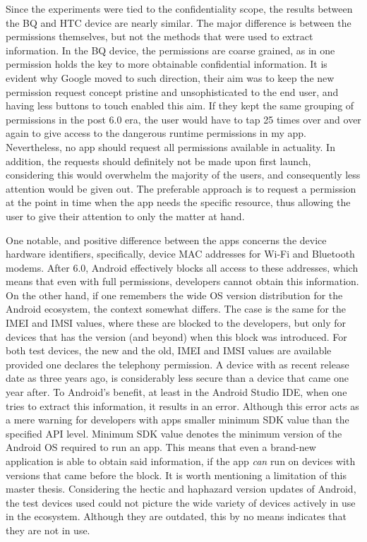 \documentclass[
  a4paper,  %
  twoside,  %
  bibliography=totoc,
  headsepline,
  cleardoublepage=empty,
  parskip=half,
  draft=false,
  open=any
]{scrbook}
\begin{document}
Since the experiments were tied to the confidentiality scope, the results between the BQ and HTC device are nearly similar. The major difference is between the permissions themselves, but not the methods that were used to extract information. In the BQ device, the permissions are coarse grained, as in one permission holds the key to more obtainable confidential information. It is evident why Google moved to such direction, their aim was to keep the new permission request concept pristine and unsophisticated to the end user, and having less buttons to touch enabled this aim. If they kept the same grouping of permissions in the post 6.0 era, the user would have to tap 25 times over and over again to give access to the dangerous runtime permissions in my app. Nevertheless, no app should request all permissions available in actuality. In addition, the requests should definitely not be made upon first launch, considering this would overwhelm the majority of the users, and consequently less attention would be given out. The preferable approach is to request a permission at the point in time when the app needs the specific resource, thus allowing the user to give their attention to only the matter at hand.

One notable, and positive difference between the apps concerns the device hardware identifiers, specifically, device MAC addresses for Wi-Fi and Bluetooth modems. After 6.0, Android effectively blocks all access to these addresses, which means that even with full permissions, developers cannot obtain this information. On the other hand, if one remembers the wide OS version distribution for the Android ecosystem, the context somewhat differs. The case is the same for the IMEI and IMSI values, where these are blocked to the developers, but only for devices that has the version (and beyond) when this block was introduced. For both test devices, the new and the old, IMEI and IMSI values are available provided one declares the telephony permission. A device with as recent release date as three years ago, is considerably less secure than a device that came one year after. To Android's benefit, at least in the Android Studio IDE, when one tries to extract this information, it results in an error. Although this error acts as a mere warning for developers with apps smaller minimum SDK value than the specified API level. Minimum SDK value denotes the minimum version of the Android OS required to run an app. This means that even a brand-new application is able to obtain said information, if the app \textit{can} run on devices with versions that came before the block. It is worth mentioning a limitation of this master thesis. Considering the hectic and haphazard version updates of Android, the test devices used could not picture the wide variety of devices actively in use in the ecosystem. Although they are outdated, this by no means indicates that they are not in use. 
\end{document}
